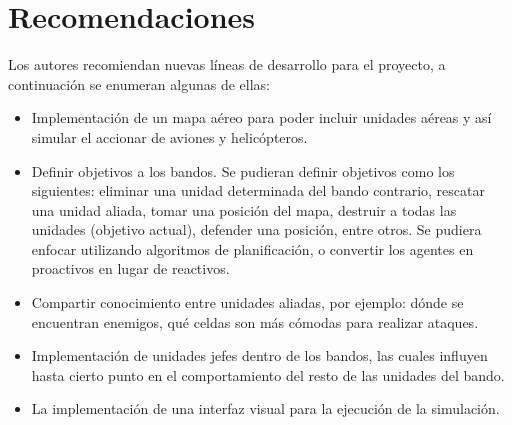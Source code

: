 \section{Recomendaciones}

Los autores recomiendan nuevas líneas de desarrollo para el proyecto, a continuación se enumeran algunas de ellas:

\begin{itemize}
    \item Implementación de un mapa aéreo para poder incluir unidades aéreas y así simular el accionar de aviones y helicópteros.
    \item Definir objetivos a los bandos. Se pudieran definir objetivos como los siguientes: eliminar una unidad determinada del bando contrario, rescatar una unidad aliada, tomar una posición del mapa, destruir a todas las unidades (objetivo actual), defender una posición, entre otros. Se pudiera enfocar utilizando algoritmos de planificación, o convertir los agentes en proactivos en lugar de reactivos.
    \item Compartir conocimiento entre unidades aliadas, por ejemplo: dónde se encuentran enemigos, qué celdas son más cómodas para realizar ataques.
    \item Implementación de unidades jefes dentro de los bandos, las cuales influyen hasta cierto punto en el comportamiento del resto de las unidades del bando. 
    \item La implementación de una interfaz visual para la ejecución de la simulación.
\end{itemize}